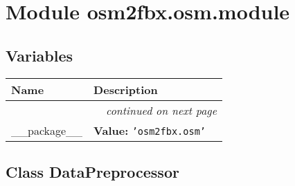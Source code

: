 %
%
%


\section{Module osm2fbx.osm.module}

    \label{osm2fbx:osm:module}


  \subsection{Variables}

    \vspace{-1cm}
\hspace{\varindent}\begin{longtable}{|p{\varnamewidth}|p{\vardescrwidth}|l}
\cline{1-2}
\cline{1-2} \centering \textbf{Name} & \centering \textbf{Description}& \\
\cline{1-2}
\endhead\cline{1-2}\multicolumn{3}{r}{\small\textit{continued on next page}}\\\endfoot\cline{1-2}
\endlastfoot\raggedright \_\-\_\-p\-a\-c\-k\-a\-g\-e\-\_\-\_\- & \raggedright \textbf{Value:} 
{\tt \texttt{'}\texttt{osm2fbx.osm}\texttt{'}}&\\
\cline{1-2}
\end{longtable}



\subsection{Class DataPreprocessor}

